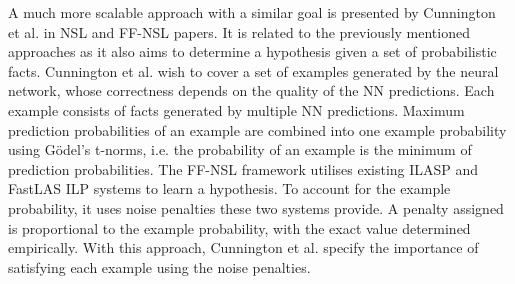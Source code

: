 A much more scalable approach with a similar goal is presented by Cunnington et al. in NSL and FF-NSL papers.
It is related to the previously mentioned approaches as it also aims to determine a hypothesis given a set of probabilistic facts.
Cunnington et al. wish to cover a set of examples generated by the neural network, whose correctness depends on the quality of the NN predictions.
Each example consists of facts generated by multiple NN predictions.
Maximum prediction probabilities of an example are combined into one example probability using G\"{o}del's t-norms, i.e. the probability of an example is the minimum of prediction probabilities.
The FF-NSL framework utilises existing ILASP \cite{RefWorks:RefID:54-ilasp} and FastLAS \cite{RefWorks:RefID:19-law2020fastlas:} ILP systems to learn a hypothesis.
To account for the example probability, it uses noise penalties these two systems provide.
A penalty assigned is proportional to the example probability, with the exact value determined empirically.
With this approach, Cunnington et al. specify the importance of satisfying each example using the noise penalties.
